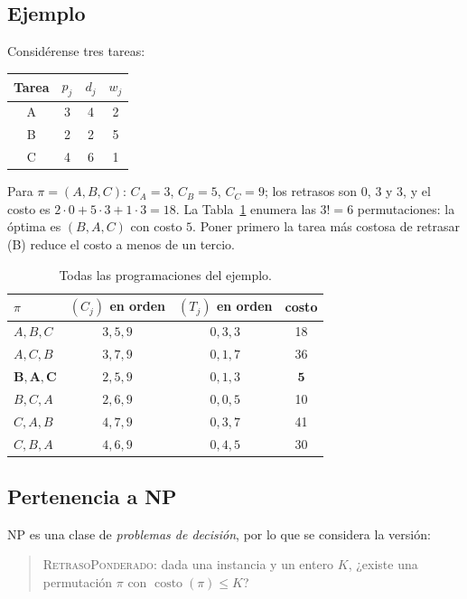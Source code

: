 \documentclass[10pt,twocolumn,letterpaper]{article}
\newcommand{\costo}{\operatorname{costo}}
\begin{document}
\subsection{Ejemplo}\label{sec:ejemplo}

Considérense tres tareas:

\begin{center}
\begin{tabular}{cccc}
\toprule
Tarea & $p_j$ & $d_j$ & $w_j$\\
\midrule
A & 3 & 4 & 2\\
B & 2 & 2 & 5\\
C & 4 & 6 & 1\\
\bottomrule
\end{tabular}
\end{center}

Para $\pi=(A,B,C)$: $C_A=3$, $C_B=5$, $C_C=9$; los retrasos son $0$, $3$ y
$3$, y el costo es $2\cdot0+5\cdot3+1\cdot3=18$. La Tabla~\ref{tab:perm}
enumera las $3!=6$ permutaciones: la óptima es $(B,A,C)$ con costo $5$.
Poner primero la tarea más costosa de retrasar (B) reduce el costo a menos de
un tercio.

\begin{table}[h]
\centering
\caption{Todas las programaciones del ejemplo.}\label{tab:perm}
\begin{tabular}{lccc}
\toprule
$\pi$ & $(C_j)$ en orden & $(T_j)$ en orden & costo\\
\midrule
$A,B,C$ & $3,5,9$ & $0,3,3$ & 18\\
$A,C,B$ & $3,7,9$ & $0,1,7$ & 36\\
$\mathbf{B,A,C}$ & $2,5,9$ & $0,1,3$ & $\mathbf{5}$\\
$B,C,A$ & $2,6,9$ & $0,0,5$ & 10\\
$C,A,B$ & $4,7,9$ & $0,3,7$ & 41\\
$C,B,A$ & $4,6,9$ & $0,4,5$ & 30\\
\bottomrule
\end{tabular}
\end{table}

\subsection{Pertenencia a NP}

NP es una clase de \emph{problemas de decisión}, por lo que se considera la
versión:

\begin{quote}
\textsc{RetrasoPonderado}: dada una instancia y un entero $K$, ¿existe una
permutación $\pi$ con $\costo(\pi)\le K$?
\end{quote}
\end{document}
